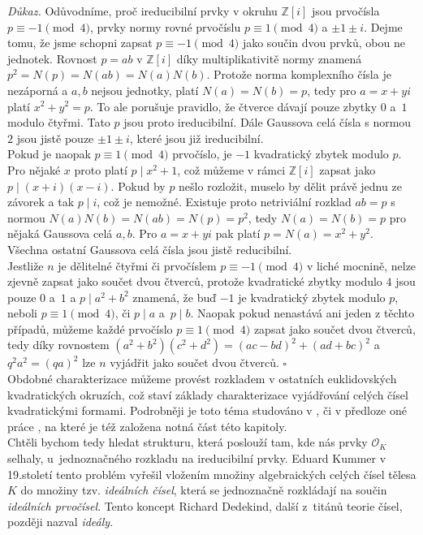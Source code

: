 \documentclass [12pt]{report}
\begin{document}
\noindent \textit{Důkaz.} Odůvodníme, proč ireducibilní prvky v okruhu $\mathbb{Z}[i]$ jsou prvočísla $p \equiv -1 \pmod{4}$, prvky normy rovné prvočíslu $p \equiv 1 \pmod{4}$ a $\pm 1 \pm i$. Dejme tomu, že jsme schopni zapsat $p \equiv -1 \pmod{4}$ jako součin dvou prvků, obou ne jednotek. Rovnost $p = ab$ v $\mathbb{Z}[i]$ díky multiplikativitě normy znamená $p^2 = N(p)=N(ab)=N(a)N(b)$. Protože norma komplexního čísla je nezáporná a $a,b$ nejsou jednotky, platí $N(a)=N(b)=p$, tedy pro $a=x+yi$ platí $x^2+y^2 = p$. To ale porušuje pravidlo, že čtverce dávají pouze zbytky $0$ a~$1$ modulo čtyřmi. Tato $p$ jsou proto ireducibilní. Dále Gaussova celá čísla s normou $2$ jsou jistě pouze $\pm 1 \pm i$, které jsou již ireducibilní.\\

Pokud je naopak $p \equiv 1 \pmod{4}$ prvočíslo, je $-1$ kvadratický zbytek modulo $p$. Pro nějaké $x$ proto platí $p \mid x^2+1$, což můžeme v rámci $\mathbb{Z}[i]$ zapsat jako $p \mid (x+i)(x-i)$. Pokud by $p$ nešlo rozložit, muselo by dělit právě jednu ze závorek a tak $p \mid i$, což je nemožné. Existuje proto netriviální rozklad $ab = p$ s normou $N(a)N(b) = N(ab) = N(p)=p^2$, tedy $N(a)=N(b)=p$ pro nějaká Gaussova celá $a,b$. Pro $a = x+yi$ pak platí $p = N(a) = x^2+y^2$. Všechna ostatní Gaussova celá čísla jsou jistě reducibilní.\\

Jestliže $n$ je dělitelné čtyřmi či prvočíslem $p \equiv -1 \pmod{4}$ v liché mocnině, nelze zjevně zapsat jako součet dvou čtverců, protože kvadratické zbytky modulo $4$ jsou pouze $0$ a~$1$ a $p \mid a^2+b^2$ znamená, že buď $-1$ je kvadratický zbytek modulo $p$, neboli $p \equiv 1 \pmod{4}$, či $p \mid a$ a~$p \mid b$. Naopak pokud nenastává ani jeden z těchto případů, můžeme každé prvočíslo $p \equiv 1 \pmod{4}$ zapsat jako součet dvou čtverců, tedy díky rovnostem $(a^2+b^2)(c^2+d^2) = (ac-bd)^2+(ad+bc)^2$ a $q^2 a^2 = (qa)^2$ lze $n$ vyjádřit jako součet dvou čtverců. \hfill $\square$\\

Obdobné charakterizace můžeme provést rozkladem v ostatních euklidovských kvadratických okruzích, což staví základy charakterizace vyjádřování celých čísel kvadratickými formami. Podrobněji je toto téma studováno v \cite{Tomas}, či v předloze oné práce \cite{Cox}, na které je též založena notná část této kapitoly.\\

 Chtěli bychom tedy hledat strukturu, která poslouží tam, kde nás prvky $\mathcal{O}_K$ selhaly, u~jednoznačného rozkladu na ireducibilní prvky. Eduard Kummer v 19.století tento problém vyřešil vložením množiny algebraických celých čísel tělesa $K$ do množiny tzv. \textit{ideálních čísel}, která se jednoznačně rozkládají na součin \textit{ideálních prvočísel}. Tento koncept Richard Dedekind, další z~titánů teorie čísel, později nazval \textit{ideály}.
\end{document}
